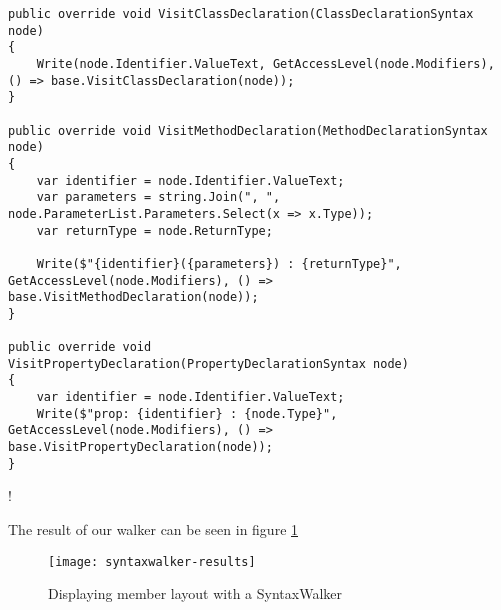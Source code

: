 \begin{minipage}{\linewidth}
\begin{lstlisting}[label={lst:syntaxwalker-handling-visits}]
public override void VisitClassDeclaration(ClassDeclarationSyntax node)
{
    Write(node.Identifier.ValueText, GetAccessLevel(node.Modifiers), () => base.VisitClassDeclaration(node));
}

public override void VisitMethodDeclaration(MethodDeclarationSyntax node)
{
	var identifier = node.Identifier.ValueText;
	var parameters = string.Join(", ", node.ParameterList.Parameters.Select(x => x.Type));
	var returnType = node.ReturnType;

	Write($"{identifier}({parameters}) : {returnType}", GetAccessLevel(node.Modifiers), () => base.VisitMethodDeclaration(node));
}

public override void VisitPropertyDeclaration(PropertyDeclarationSyntax node)
{
	var identifier = node.Identifier.ValueText;
	Write($"prop: {identifier} : {node.Type}", GetAccessLevel(node.Modifiers), () => base.VisitPropertyDeclaration(node));
}
\end{lstlisting}
\end{minipage}
\ifx{\verb+$$+}!\fi %


\noindent The result of our walker can be seen in figure \ref{syntaxwalker-results}

\begin{figure}[H]
\centering
\texttt{[image: syntaxwalker-results]}
\caption[Displaying member layout with a SyntaxWalker]{Displaying member layout with a SyntaxWalker}
\label{syntaxwalker-results}
\end{figure}


